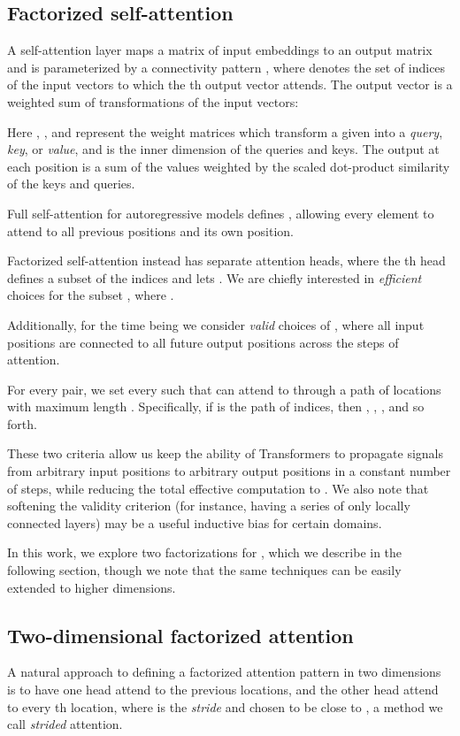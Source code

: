 \documentclass{article}
\begin{document}
\subsection{Factorized self-attention}
A self-attention layer maps a matrix of input embeddings  to an output matrix and is parameterized by a connectivity pattern , where  denotes the set of indices of the input vectors to which the th output vector attends. The output vector is a weighted sum of transformations of the input vectors:







Here , , and  represent the weight matrices which transform a given  into a \textit{query}, \textit{key}, or \textit{value}, and  is the inner dimension of the queries and keys. The output at each position is a sum of the values weighted by the scaled dot-product similarity of the keys and queries.

Full self-attention for autoregressive models defines , allowing every element to attend to all previous positions and its own position. 

Factorized self-attention instead has  separate attention heads, where the th head defines a subset of the indices  and lets .  We are chiefly interested in \textit{efficient} choices for the subset , where .

Additionally, for the time being we consider \textit{valid} choices of , where all input positions are connected to all future output positions across the  steps of attention.

For every  pair, we set every  such that  can attend to  through a path of locations with maximum length . Specifically, if  is the path of indices, then , , , and so forth.

These two criteria allow us keep the ability of Transformers to propagate signals from arbitrary input positions to arbitrary output positions in a constant number of steps, while reducing the total effective computation to . We also note that softening the validity criterion (for instance, having a series of only locally connected layers) may be a useful inductive bias for certain domains.

In this work, we explore two factorizations for , which we describe in the following section, though we note that the same techniques can be easily extended to higher dimensions.

\subsection{Two-dimensional factorized attention}
A natural approach to defining a factorized attention pattern in two dimensions is to have one head attend to the previous  locations, and the other head attend to every th location, where  is the \textit{stride} and chosen to be close to , a method we call \textit{strided} attention. 
\end{document}
